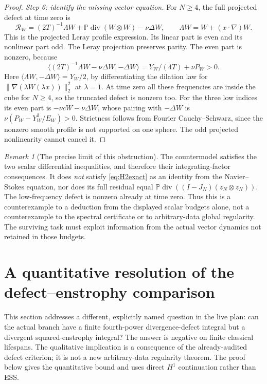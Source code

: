 \documentclass[11pt,a4paper]{article}
\theoremstyle{definition}\newtheorem{definition}[theorem]{Definition}
\theoremstyle{remark}\newtheorem{remark}[theorem]{Remark}
\newcommand{\PP}{\mathbb P}
\newcommand{\norm}[1]{\lVert #1\rVert}
\newcommand{\ip}[2]{\langle #1,#2\rangle}
\newcommand{\diver}{\operatorname{div}}
\numberwithin{equation}{section}
\begin{document}
\begin{proof}
\emph{Step 6: identify the missing vector equation.}
For $N\ge4$, the full projected defect at time zero is
\begin{equation}\label{eq:capresidual}
 \mathcal R_W=(2T)^{-1}\Lambda W+\PP\diver(W\otimes W)-\nu\Delta W,
 \qquad\Lambda W=W+(x\cdot\nabla)W.
\end{equation}
This is the projected Leray profile expression. Its linear part is even and its nonlinear part odd. The Leray projection preserves parity. The even part is nonzero, because
\[
 \ip{(2T)^{-1}\Lambda W-\nu\Delta W}{-\Delta W}
 =Y_W/(4T)+\nu P_W>0.
\]
Here $\ip{\Lambda W}{-\Delta W}=Y_W/2$, by differentiating the dilation law for $\norm{\nabla(\lambda W(\lambda x))}_2^2$ at $\lambda=1$. At time zero all these frequencies are inside the cube for $N\ge4$, so the truncated defect is nonzero too. For the three low indices its even part is $-\nu cW-\nu\Delta W$, whose pairing with $-\Delta W$ is
$\nu(P_W-Y_W^2/E_W)>0$. Strictness follows from Fourier Cauchy--Schwarz, since the nonzero smooth profile is not supported on one sphere. The odd projected nonlinearity cannot cancel it.
\end{proof}

\begin{remark}[The precise limit of this obstruction]
The countermodel satisfies the two scalar differential inequalities, and therefore their integrating-factor consequences. It does \emph{not} satisfy \eqref{eq:H2exact} as an identity from the Navier--Stokes equation, nor does its full residual equal $\PP\diver((I-J_N)(z_N\otimes z_N))$. The low-frequency defect is nonzero already at time zero. Thus this is a counterexample to a deduction from the displayed scalar budgets alone, not a counterexample to the spectral certificate or to arbitrary-data global regularity. The surviving task must exploit information from the actual vector dynamics not retained in those budgets.
\end{remark}

\section{A quantitative resolution of the defect--enstrophy comparison}
\label{sec:defect}
This section addresses a different, explicitly named question in the live plan: can the actual branch have a finite fourth-power divergence-defect integral but a divergent squared-enstrophy integral? The answer is negative on finite classical lifespans. The qualitative implication is a consequence of the already-audited defect criterion; it is not a new arbitrary-data regularity theorem. The proof below gives the quantitative bound and uses direct $H^1$ continuation rather than ESS.
\end{document}

